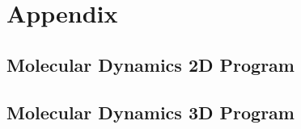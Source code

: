 \documentclass[reprint,amsmath,amssymb, aps, 10pt, a4paper, english, reqno]{revtex4-1}
\begin{document}



\clearpage
\onecolumngrid
\appendix

\section*{Appendix} 
\subsection{Molecular Dynamics 2D Program}


\subsection{Molecular Dynamics 3D Program}

\end{document}
